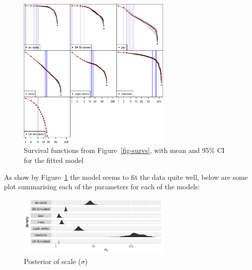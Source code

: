 \documentclass[
  10pt,
  a4paper,
]{scrreprt}
\theoremstyle{definition}
\theoremstyle{plain}
\theoremstyle{plain}
\theoremstyle{remark}
\begin{document}
{\begin{figure}[H]
{\centering \includegraphics[width=0.66\textwidth,height=\textheight]{doc_files/figure-pdf/fig-fits1-1.pdf}

}

\caption{\label{fig-fits1}Survival functions from
Figure~\ref{fig-survs}, with mean and 95\% CI for the fitted model}

\end{figure}

As show by Figure~\ref{fig-fits1} the model seems to fit the data quite
well, below are some plot summarising each of the parameters for each of
the models:

\begin{figure}[H]

{\centering \includegraphics[width=0.66\textwidth,height=\textheight]{doc_files/figure-pdf/fig-scale-1.pdf}

}

\caption{\label{fig-scale}Posterior of scale (\(\sigma\))}

\end{figure}

\begin{figure}

\begin{minipage}[t]{0.50\linewidth}

{\centering 

}
\end{minipage}
\end{figure}}
\end{document}
